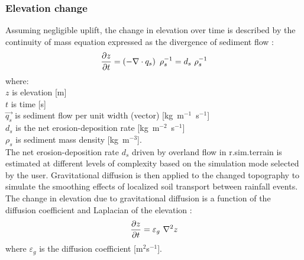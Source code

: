 \documentclass[gmd, manuscript]{copernicus}
\begin{document}
\subsubsection{Elevation change} 
Assuming negligible uplift, the change in elevation over time 
is described by the continuity of mass equation 
expressed as the divergence of sediment flow  \citep{Tucker2001}:
\begin{equation}
\label{eq:evolution} 
{\partial z \over \partial t } = \left (-\nabla \cdot \vec{q_s} \right ) ~ \rho_s^{-1} = d_s ~ \rho_s^{-1} 
\end{equation}
{\small
where: \\
\noindent
\hspace*{0.5em} $z$ is elevation [\unit{m}] \\
\hspace*{0.5em} $t$ is time [\unit{s}] \\
\hspace*{0.5em} $\vec {q_s}$ is sediment flow per unit width (vector) [\unit{kg~m}$^{-1}$~\unit{s}$^{-1}$]\\
\hspace*{0.5em} $d_s$ is the net erosion-deposition rate [\unit{kg~m}$^{-2}$~\unit{s}$^{-1}$]\\
\hspace*{0.5em} $\rho_s$ is sediment mass density [\unit{kg~m}$^{-3}$].\\
}
The net erosion-deposition rate $d_s$ driven by overland flow
in r.sim.terrain is estimated at different levels of complexity based 
on the simulation mode selected by the user.
Gravitational diffusion is then applied to the changed topography 
to simulate the smoothing effects 
of localized soil transport between rainfall events.
The change in elevation due to gravitational diffusion
is a function of the diffusion coefficient and Laplacian of the elevation
\citep{Thaxton2004}:
\begin{equation}
\label{eq:grav_diffusion} 
{\partial z \over \partial t } =  \varepsilon_g ~ \nabla^2 z 
\end{equation}
\noindent
where $\varepsilon_g$ is the diffusion coefficient [\unit{m}$^2$\unit{s}$^{-1}$].
\end{document}
